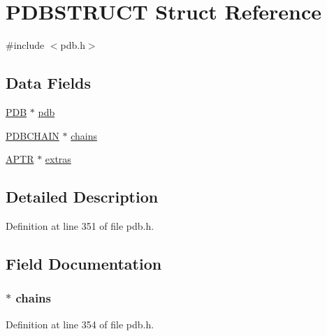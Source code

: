 \hypertarget{struct_p_d_b_s_t_r_u_c_t}{\section{P\-D\-B\-S\-T\-R\-U\-C\-T Struct Reference}
\label{struct_p_d_b_s_t_r_u_c_t}
}


{\ttfamily \#include $<$pdb.\-h$>$}

\subsection*{Data Fields}
\begin{DoxyCompactItemize}
\item 
\hyperlink{pdb_8h_aa31eb9fe57a50b29778e64bb131b22bf}{P\-D\-B} $\ast$ \hyperlink{struct_p_d_b_s_t_r_u_c_t_a9cac171f884f9ad8fd8dbb4d36b233a0}{pdb}
\item 
\hyperlink{pdb_8h_a171a14ea1de15b755842b9011759d31c}{P\-D\-B\-C\-H\-A\-I\-N} $\ast$ \hyperlink{struct_p_d_b_s_t_r_u_c_t_a44f546a1879c9d643a92b723cd98a000}{chains}
\item 
\hyperlink{_sys_defs_8h_a201013872f88d6f535b12e644d7f4d5a}{A\-P\-T\-R} $\ast$ \hyperlink{struct_p_d_b_s_t_r_u_c_t_aaa357dbbf4b88fcb1df71547b2d085a6}{extras}
\end{DoxyCompactItemize}


\subsection{Detailed Description}


Definition at line 351 of file pdb.\-h.



\subsection{Field Documentation}
\hypertarget{struct_p_d_b_s_t_r_u_c_t_a44f546a1879c9d643a92b723cd98a000}{
\subsubsection[{chains}]{$\ast$ chains}}\label{struct_p_d_b_s_t_r_u_c_t_a44f546a1879c9d643a92b723cd98a000}


Definition at line 354 of file pdb.\-h.

